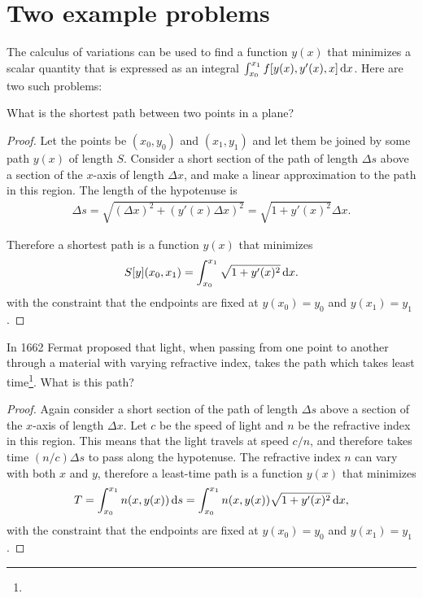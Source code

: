
\section{Two example problems}
The calculus of variations can be used to find a function $y(x)$ that minimizes a scalar quantity that is expressed as an
integral $\int_{x_0}^{x_1} f[y(x), y'(x), x] \dx$. Here are two such problems:

\begin{question*}
  What is the shortest path between two points in a plane?
\end{question*}

\begin{proof}
  Let the points be $(x_0, y_0)$ and $(x_1, y_1)$ and let them be joined by some path $y(x)$ of length $S$. Consider a short section of the path of
  length $\Delta s$ above a section of the $x$-axis of length $\Delta x$, and make a linear approximation to the path in this region. The length of the
  hypotenuse is
  \begin{align*}
    \Delta s = \sqrt{(\Delta x)^2 + (y'(x)\Delta x)^2} = \sqrt{1 + y'(x)^2} \Delta x.
  \end{align*}

  Therefore a shortest path is a function $y(x)$ that minimizes
  \begin{align*}
    S[y](x_0, x_1) = \int_{x_0}^{x_1} \sqrt{1 + y'(x)^2}\dx.
  \end{align*}
  with the constraint that the endpoints are fixed at $y(x_0) = y_0$ and $y(x_1) = y_1$.

\end{proof}


\begin{question*}
  In 1662 Fermat proposed that light, when passing from one point to another through a material with varying refractive index, takes the path which
  takes least time\footnote{}. What is
  this path?
\end{question*}

\begin{proof}
  Again consider a short section of the path of length $\Delta s$ above a section of the $x$-axis of length $\Delta x$. Let $c$ be the speed of light and
  $n$ be the refractive index in this region. This means that the light travels at speed $c/n$, and therefore takes time $(n/c)\Delta s$ to pass along the
  hypotenuse. The refractive index $n$ can vary with both $x$ and $y$, therefore a least-time path is a function $y(x)$ that minimizes
  \begin{align*}
    T = \int_{x_0}^{x_1} n(x, y(x)) \d s = \int_{x_0}^{x_1} n(x, y(x)) \sqrt{1 + y'(x)^2} \dx,
  \end{align*}
  with the constraint that the endpoints are fixed at $y(x_0) = y_0$ and $y(x_1) = y_1$.

\end{proof}

